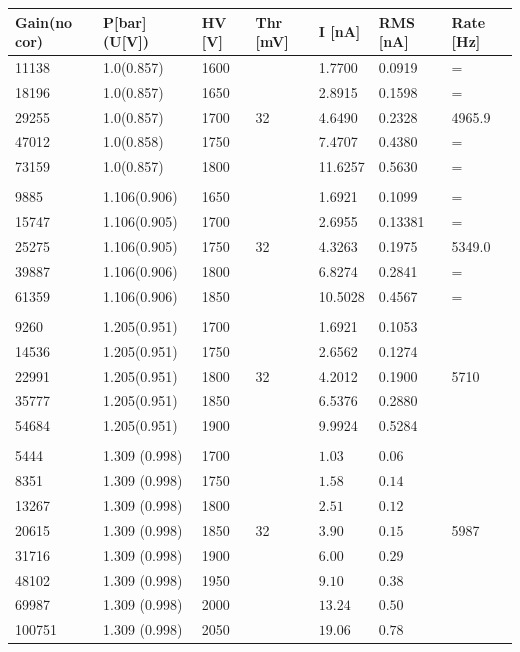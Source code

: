 \documentclass[pdftex,14pt]{scrartcl}
\begin{document}
	\begin{table}[!h]
	\centering
	\begin{tabular}{|l|l|l|l|l|l|l|}
		\hline
		Gain(no cor) & P[bar] (U[V]) & HV [V] & Thr [mV]&  I [nA] & RMS [nA] & Rate [Hz]  \\
		\hline
		11138 & 1.0(0.857) & 1600 & &  1.7700 & 0.0919 & = \\
		\hline
		18196 & 1.0(0.857) & 1650 & &  2.8915 & 0.1598 & = \\
		\hline
		29255 & 1.0(0.857) & 1700 & 32 & 4.6490 & 0.2328 & 4965.9 \\
		\hline
		47012 & 1.0(0.858) & 1750 & & 7.4707 & 0.4380 & = \\
		\hline
		73159 & 1.0(0.857) & 1800 & & 11.6257 & 0.5630 & = \\
		\hline
		
		& & & & & & \\
		\hline
		
		9885 & 1.106(0.906) & 1650 & & 1.6921 & 0.1099 & = \\
		\hline
		15747 & 1.106(0.905)& 1700 & & 2.6955 & 0.13381 & = \\
		\hline
		25275 & 1.106(0.905)& 1750 & 32 & 4.3263 & 0.1975 & 5349.0 \\
		\hline
		39887 & 1.106(0.906)& 1800 & & 6.8274 & 0.2841 & = \\
		\hline
		61359 & 1.106(0.906)& 1850 & & 10.5028 & 0.4567 & = \\
		\hline
		
		& & & & & & \\
		\hline
		
		9260 & 1.205(0.951) & 1700  & & 1.6921 & 0.1053 & \\
		\hline
		14536 & 1.205(0.951) & 1750 & & 2.6562 & 0.1274 & \\
		\hline
		22991 & 1.205(0.951) & 1800 & 32 & 4.2012 & 0.1900 & 5710 \\
		\hline
		35777 & 1.205(0.951) & 1850 & & 6.5376 & 0.2880 & \\
		\hline
		54684 & 1.205(0.951) & 1900 & & 9.9924 & 0.5284 & \\
		\hline
		
		& & & & & & \\
		\hline
		
		5444 & 1.309 (0.998) & 1700 &  & $1.03 $ & $ 0.06 $ & \\
		\hline
		8351 & 1.309 (0.998) & 1750 &  & $1.58 $ & $ 0.14$ & \\
		\hline
		13267 & 1.309 (0.998) & 1800 &  & $2.51 $ & $ 0.12 $ & \\
		\hline
		20615 & 1.309 (0.998) & 1850 & 32 & $3.90 $ & $ 0.15 $ & 5987 \\
		\hline
		31716 & 1.309 (0.998) & 1900 &  & $6.00 $ & $ 0.29 $ & \\
		\hline
		48102 & 1.309 (0.998) & 1950 &  & $9.10 $ & $ 0.38 $ & \\
		\hline
		69987 & 1.309 (0.998) & 2000 &  & $13.24 $ & $ 0.50 $ & \\
		\hline
		100751 & 1.309 (0.998) & 2050 &  & $19.06 $ & $ 0.78 $ & \\
		\hline
		

\end{tabular}
\end{table}
\end{document}
